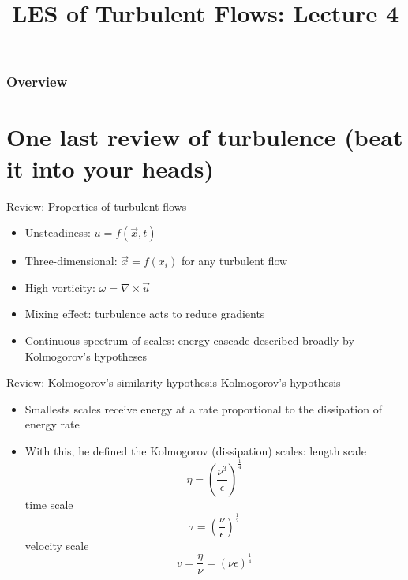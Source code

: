
\title{LES of Turbulent Flows: Lecture 4}



\begin{frame} 
  \titlepage
\end{frame}


\begin{frame}
\frametitle{Overview}
\tableofcontents
\end{frame}

\section{One last review of turbulence (beat it into your heads)} %
\begin{frame}{Review: Properties of turbulent flows}

\begin{itemize}
	\item Unsteadiness: $u = f(\vec{x},t)$
	\item Three-dimensional: $\vec{x} = f(x_i)$ for any turbulent flow
	\item High vorticity: $\omega = \nabla \times \vec{u}$
	\item Mixing effect: turbulence acts to reduce gradients
	\item Continuous spectrum of scales: energy cascade described broadly by Kolmogorov's hypotheses
\end{itemize}

\end{frame}


\begin{frame}{Review: Kolmogorov's similarity hypothesis}
Kolmogorov's  hypothesis
\begin{itemize}
	\item Smallests scales receive energy at a rate proportional to the dissipation of energy rate
	\item With this, he defined the Kolmogorov (dissipation) scales:\newline\newline
	length scale $$\eta = \left(\frac{\nu^3}{\epsilon}\right)^{\frac{1}{4}}$$
	time scale $$\tau = \left(\frac{\nu}{\epsilon}\right)^{\frac{1}{2}}$$
	velocity scale $$v = \frac{\eta}{\nu} = (\nu \epsilon)^{\frac{1}{4}}$$
\end{itemize}

\end{frame}

